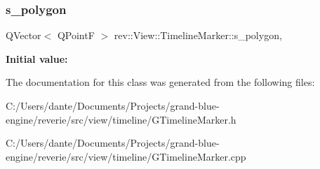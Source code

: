 \subsubsection{\texorpdfstring{s\_polygon}{s\_polygon}}
{\footnotesize\ttfamily Q\+Vector$<$ Q\+PointF $>$ rev\+::\+View\+::\+Timeline\+Marker\+::s\+\_\+polygon\hspace{0.3cm}{\ttfamily [static]}, {\ttfamily [protected]}}

{\bfseries Initial value\+:}
\begin{DoxyCode}{0}
\DoxyCodeLine{= \{}
\DoxyCodeLine{\}}

\end{DoxyCode}


The documentation for this class was generated from the following files\+:\begin{DoxyCompactItemize}
\item 
C\+:/\+Users/dante/\+Documents/\+Projects/grand-\/blue-\/engine/reverie/src/view/timeline/G\+Timeline\+Marker.\+h\item 
C\+:/\+Users/dante/\+Documents/\+Projects/grand-\/blue-\/engine/reverie/src/view/timeline/G\+Timeline\+Marker.\+cpp\end{DoxyCompactItemize}
